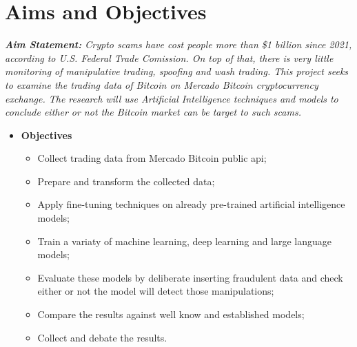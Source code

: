 \section{Aims and Objectives}
\textit{\textbf{Aim Statement:} Crypto scams have cost people more than \$1 billion since 2021, according to U.S.
Federal Trade Comission. On top of that, there is very little monitoring of manipulative trading, spoofing and wash
trading. This project seeks to examine the trading data of Bitcoin on Mercado Bitcoin cryptocurrency exchange. The
research will use Artificial Intelligence techniques and models to conclude either or not the Bitcoin market can be
target to such scams.}

\begin{itemize}
    \item[] \textbf{Objectives}
    \begin{itemize}
        \item Collect trading data from Mercado Bitcoin public api;
        \item Prepare and transform the collected data;
        \item Apply fine-tuning techniques on already pre-trained artificial intelligence models;
        \item Train a variaty of machine learning, deep learning and large language models;
        \item Evaluate these models by deliberate inserting fraudulent data and check either or not the model will
        detect those manipulations;
        \item Compare the results against well know and established models;
        \item Collect and debate the results.
    \end{itemize}
\end{itemize}